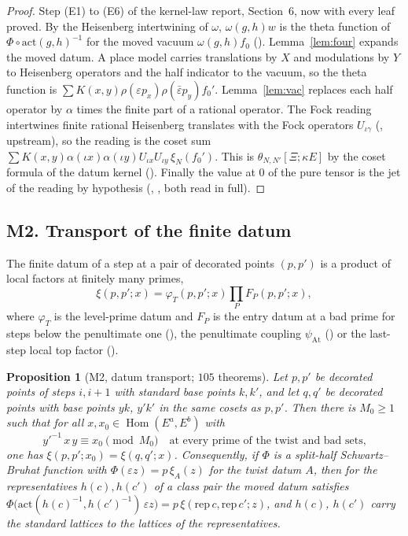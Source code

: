\documentclass[11pt]{article}
\newcommand{\Hom}{\operatorname{Hom}}
\newtheorem{proposition}[theorem]{Proposition}
\theoremstyle{remark}
\begin{document}
\begin{proof}
Step (E1) to (E6) of the kernel-law report, Section~6, now with every leaf proved. By the Heisenberg intertwining of $\omega$, $\omega(g,h)w$ is the theta function of $\Phi\circ\mathrm{act}(g,h)^{-1}$ for the moved vacuum $\omega(g,h)f_0$ (). Lemma~\ref{lem:four} expands the moved datum. A place model carries translations by $X$ and modulations by $Y$ to Heisenberg operators and the half indicator to the vacuum, so the theta function is $\sum K(x,y)\rho(\varepsilon p_x)\rho(\bar\varepsilon p_y)f_0'$. Lemma~\ref{lem:vac} replaces each half operator by $\alpha$ times the finite part of a rational operator. The Fock reading intertwines finite rational Heisenberg translates with the Fock operators $U_{\iota\gamma}$ (, upstream), so the reading is the coset sum $\sum K(x,y)\alpha(\iota x)\alpha(\iota y)U_{\iota x}U_{\iota y}\,\xi_N(f_0')$. This is $\theta_{N,N'}[\Xi;\kappa E]$ by the coset formula of the datum kernel (). Finally the value at $0$ of the pure tensor is the jet of the reading by hypothesis (, , both read in full).
\end{proof}

\subsection{M2. Transport of the finite datum}

The finite datum of a step at a pair of decorated points $(p,p')$ is a product of local factors at finitely many primes,
\[
\xi(p,p';x)=\varphi_T(p,p';x)\prod_{P}F_P(p,p';x),
\]
where $\varphi_T$ is the level-prime datum and $F_P$ is the entry datum at a bad prime for steps below the penultimate one (), the penultimate coupling $\psi_{\mathrm{At}}$ () or the last-step local top factor ().

\begin{proposition}[M2, datum transport; $105$ theorems]\label{prop:M2}
Let $p,p'$ be decorated points of steps $i,i+1$ with standard base points $k,k'$, and let $q,q'$ be decorated points with base points $yk$, $y'k'$ in the same cosets as $p,p'$. Then there is $M_0\ge1$ such that for all $x,x_0\in\Hom(E^a,E^b)$ with
\[
y'^{-1}\,x\,y\equiv x_0\pmod{M_0}\quad\text{at every prime of the twist and bad sets,}
\]
one has $\xi(p,p';x_0)=\xi(q,q';x)$. Consequently, if $\Phi$ is a split-half Schwartz--Bruhat function with $\Phi(\varepsilon z)=p\,\xi_{A}(z)$ for the twist datum $A$, then for the representatives $h(c),h(c')$ of a class pair the moved datum satisfies $\Phi\bigl(\mathrm{act}(h(c)^{-1},h(c')^{-1})\,\varepsilon z\bigr)=p\,\xi(\mathrm{rep}\,c,\mathrm{rep}\,c';z)$, and $h(c)$, $h(c')$ carry the standard lattices to the lattices of the representatives.
\end{proposition}
\end{document}
